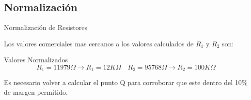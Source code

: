 \subsection{Normalización}
\begin{frame}[allowframebreaks]{Normalización de Resistores}
  \begin{minipage}[][\textheight][p]{\textwidth}
    Los valores comerciales mas cercanos a los valores calculados de $R_1$ y $R_2$ son:
    \begin{block}{Valores Normalizados}
      \begin{equation*}
        R_1 = 11979\Omega \to R_1 = 12K\Omega \quad R_2 = 95768\Omega \to R_2 = 100K\Omega
      \end{equation*}
    \end{block}
  Es necesario volver a calcular el punto Q para corroborar que este dentro del 10\% de margen permitido.
  \end{minipage}


\end{frame}
